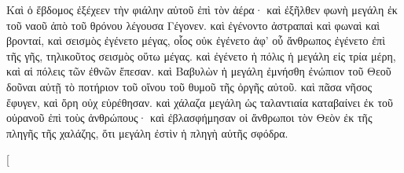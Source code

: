 \begin{pages}
\begin{Rightside}
		\pend
		\pstart
		Καὶ ὁ ἕβδομος ἐξέχεεν τὴν φιάλην αὐτοῦ ἐπὶ τὸν ἀέρα· καὶ ἐξῆλθεν φωνὴ μεγάλη ἐκ τοῦ ναοῦ ἀπὸ τοῦ θρόνου λέγουσα Γέγονεν. καὶ ἐγένοντο ἀστραπαὶ καὶ φωναὶ καὶ βρονταί, καὶ σεισμὸς ἐγένετο μέγας, οἷος οὐκ ἐγένετο ἀφ’ οὗ ἄνθρωπος ἐγένετο ἐπὶ τῆς γῆς, τηλικοῦτος σεισμὸς οὕτω μέγας.
		\pend 
		\pstart
		καὶ ἐγένετο ἡ πόλις ἡ μεγάλη εἰς τρία μέρη, καὶ αἱ πόλεις τῶν ἐθνῶν ἔπεσαν. καὶ Βαβυλὼν ἡ μεγάλη ἐμνήσθη ἐνώπιον τοῦ Θεοῦ δοῦναι αὐτῇ τὸ ποτήριον τοῦ οἴνου τοῦ θυμοῦ τῆς ὀργῆς αὐτοῦ. καὶ πᾶσα νῆσος ἔφυγεν, καὶ ὄρη οὐχ εὑρέθησαν. 
		\pend
		\pstart
		καὶ χάλαζα μεγάλη ὡς ταλαντιαία καταβαίνει ἐκ τοῦ οὐρανοῦ ἐπὶ τοὺς ἀνθρώπους· καὶ ἐβλασφήμησαν οἱ ἄνθρωποι τὸν Θεὸν ἐκ τῆς πληγῆς τῆς χαλάζης, ὅτι μεγάλη ἐστὶν ἡ πληγὴ αὐτῆς σφόδρα.
		\pend
        \endnumbering
    \end{Rightside}
    \begin{Leftside}
        \beginnumbering
        \pstart[

\end{Leftside}
\end{pages}
